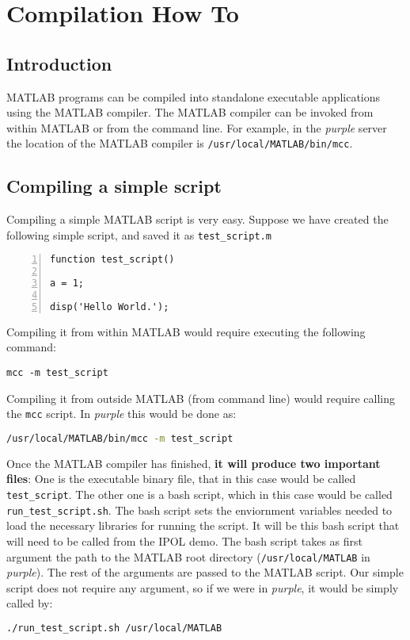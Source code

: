 \section{Compilation How To}
\subsection{Introduction}
MATLAB programs can be compiled into standalone executable applications using
the MATLAB compiler.  The MATLAB compiler can be invoked from within MATLAB or
from the command line. For example, in the \emph{purple} server the location of the
MATLAB compiler is \texttt{/usr/local/MATLAB/bin/mcc}.

\subsection{Compiling a simple script}
Compiling a simple MATLAB script is very easy. Suppose we have created the
following simple script, and saved it as \texttt{test\_script.m}
\begin{lstlisting}[numbers=left,title={First version of \texttt{test\_script.m}},captionpos=b]
function test_script()

a = 1;

disp('Hello World.');
\end{lstlisting}

Compiling it from within MATLAB would require executing the following command:

\begin{lstlisting}
mcc -m test_script
\end{lstlisting}

Compiling it from outside MATLAB (from command line) would require calling the
\texttt{mcc} script. In \emph{purple} this would be done as:

\begin{lstlisting}[language=bash]
/usr/local/MATLAB/bin/mcc -m test_script
\end{lstlisting}


Once the MATLAB compiler has finished, \textbf{it will produce two important
  files}: One is the executable binary file, that in this case would be called
\texttt{test\_script}. The other one is a bash script, which in this case would
be called \texttt{run\_test\_script.sh}. The bash script sets the enviornment
variables needed to load the necessary libraries for running the script. It will
be this bash script that will need to be called from the IPOL demo.  The bash
script takes as first argument the path to the MATLAB root directory
(\texttt{/usr/local/MATLAB} in \emph{purple}). The rest of the arguments are passed to
the MATLAB script. Our simple script does not require any argument, so if we
were in \emph{purple}, it would be simply called by:
\begin{lstlisting}[language=bash]
./run_test_script.sh /usr/local/MATLAB
\end{lstlisting}


